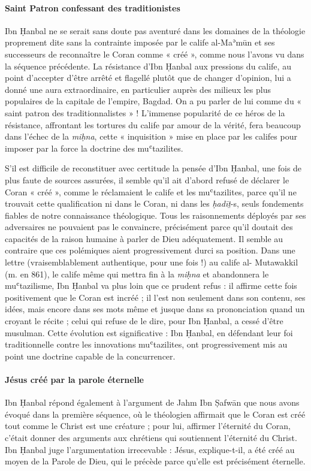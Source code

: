 \paragraph{Saint Patron confessant des traditionistes} Ibn Ḥanbal ne se serait sans doute pas aventuré dans les domaines de la
théologie proprement dite sans la contrainte imposée par le calife
al-Maʾmūn et ses successeurs de reconnaître le Coran comme « créé »,
comme nous l'avons vu dans la séquence précédente. La résistance d'Ibn
Ḥanbal aux pressions du calife, au point d'accepter d'être arrêté et
flagellé plutôt que de changer d'opinion, lui a donné une aura
extraordinaire, en particulier auprès des milieux les plus populaires de
la capitale de l'empire, Bagdad. On a pu parler de lui comme du « saint
patron des traditionnalistes » ! L'immense popularité de ce héros de la
résistance, affrontant les tortures du calife par amour de la vérité,
fera beaucoup dans l'échec de la \emph{miḥna}, cette « inquisition »
mise en place par les califes pour imposer par la force la doctrine des
muʿtazilites.

S'il est difficile de reconstituer avec certitude la pensée d'Ibn
Ḥanbal, une fois de plus faute de sources assurées, il semble qu'il ait
d'abord refusé de déclarer le Coran « créé », comme le réclamaient le
calife et les muʿtazilites, parce qu'il ne trouvait cette qualification
ni dans le Coran, ni dans les \emph{ḥadīṯ}-s, seuls fondements fiables
de notre connaissance théologique. Tous les raisonnements déployés par
ses adversaires ne pouvaient pas le convaincre, précisément parce qu'il
doutait des capacités de la raison humaine à parler de Dieu
adéquatement. Il semble au contraire que ces polémiques aient
progressivement durci
sa position. Dans une lettre (vraisemblablement authentique, pour une
fois !) au calife al- Mutawakkil (m. en 861), le calife même qui mettra
fin à la \emph{miḥna} et abandonnera le muʿtazilisme, Ibn Ḥanbal va plus
loin que ce prudent refus : il affirme cette fois positivement que le
Coran est incréé ; il l'est non seulement dans son contenu, ses idées,
mais encore dans ses mots même et jusque dans sa prononciation quand un
croyant le récite ; celui qui refuse de le dire, pour Ibn Ḥanbal, a
cessé d'être musulman. Cette évolution est significative : Ibn Ḥanbal,
en défendant leur foi traditionnelle contre les innovations
muʿtazilites, ont progressivement mis au point une doctrine capable de
la concurrencer.
\paragraph{Jésus créé par la parole éternelle}
Ibn Ḥanbal répond également à l'argument de Jahm Ibn Ṣafwān que nous
avons évoqué dans la première séquence, où le théologien affirmait que
le Coran est créé tout comme le Christ est une créature ; pour lui,
affirmer l'éternité du Coran, c'était donner des arguments aux chrétiens
qui soutiennent l'éternité du Christ. Ibn Ḥanbal juge l'argumentation
irrecevable : Jésus, explique-t-il, a été créé au moyen de la Parole de
Dieu, qui le précède parce qu'elle est précisément éternelle.


